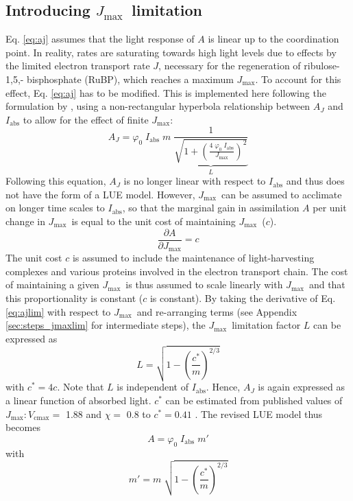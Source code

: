\documentclass[gmd, manuscript]{copernicus}
\newcommand{\vcmax}{$V_{\text{cmax}}$}
\newcommand{\jmax}{$J_{\text{max}}$}
\begin{document}
\subsection{Introducing \jmax\ limitation}
\label{sec:jmax}
Eq. \ref{eq:aj} assumes that the light response of $A$ is linear up to the coordination point. In reality, rates are saturating towards high light levels due to effects by the limited electron transport rate $J$, necessary for the regeneration of ribulose-1,5,- bisphosphate (RuBP), which reaches a maximum \jmax . To account for this effect, Eq. \ref{eq:aj} has to be modified. This is implemented here following the formulation by \citet{smith37}, using a non-rectangular hyperbola relationship between $A_J$ and $I_{\mathrm{abs}}$ to allow for the effect of finite $J_{\mathrm{max}}$:
\begin{equation}
\label{eq:ajlim}
    A_J = \varphi_0 \; I_{\mathrm{abs}} \; m \; \underbrace{ \frac{1}{\sqrt{1+ \left( \frac{4\;\varphi_0\;I_{\mathrm{abs}}}{J_{\mathrm{max}}} \right)^{2}}} }_{L}
\end{equation}
Following this equation, $A_J$ is no longer linear with respect to $I_{\mathrm{abs}}$ and thus does not have the form of a LUE model. However, \jmax\ can be assumed to acclimate on longer time scales to $I_{\mathrm{abs}}$, so that the marginal gain in assimilation $A$ per unit change in \jmax\ is equal to the unit cost of maintaining \jmax\ ($c$).
\begin{equation}
\label{eq:jmaxpartial}
    \frac{\partial A}{\partial J_{\mathrm{max}}} = c 
\end{equation}
The unit cost $c$ is assumed to include the maintenance of light-harvesting complexes and various proteins involved in the electron transport chain. The cost of maintaining a given \jmax\ is thus assumed to scale linearly with \jmax\ and that this proportionality is constant ($c$ is constant). By taking the derivative of Eq. \ref{eq:ajlim} with respect to \jmax\ and re-arranging terms (see Appendix \ref{sec:steps_jmaxlim} for intermediate steps), the \jmax\ limitation factor $L$ can be expressed as
\begin{equation}
\label{eq:factor_jmaxlim}
    L = \sqrt{ 1 - \left( \frac{c^\ast}{m} \right)^{2/3} }
\end{equation}
with $c^\ast = 4c$. Note that $L$ is independent of $I_\text{abs}$. Hence, $A_J$ is again expressed as a linear function of absorbed light. $c^\ast$ can be estimated from published values of \jmax $:$\vcmax $=$ 1.88 \citep{kattge07} and $\chi =$ 0.8 \citep{lloyd94} to $c^\ast = 0.41$ \citep{wang17natpl}. The revised LUE model thus becomes
\begin{equation}
\label{eq:ajlim4}
    A = \varphi_0 \; I_{\mathrm{abs}} \; m'
\end{equation}
with
\begin{equation}
\label{eq:mprime}
    m' = m \; \sqrt{1 - \left( \frac{c^\ast}{m} \right)^{2/3} }
\end{equation}
\end{document}
